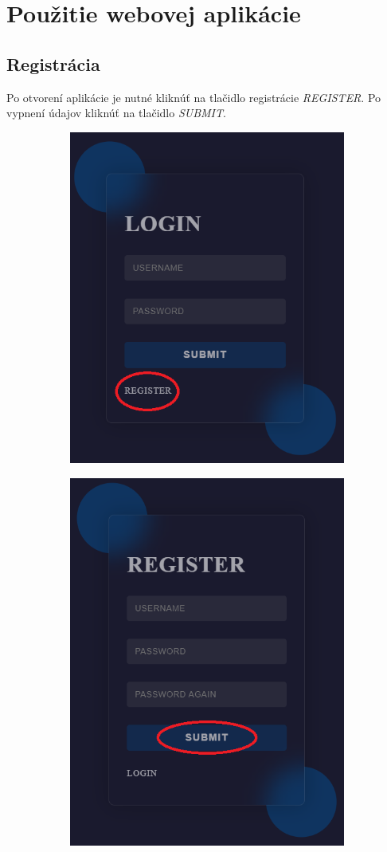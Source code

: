 \pagebreak
\section{Použitie webovej aplikácie}

\subsection{Registrácia}
Po otvorení aplikácie je nutné kliknúť na tlačidlo registrácie \textit{REGISTER}. Po vypnení údajov kliknúť na tlačidlo \textit{SUBMIT}.

\begin{figure}[H]
    \centering
    \begin{subfigure}{0.45\textwidth}
        \centering
        \includegraphics[width=.7\textwidth]{guide_includes/img/register_button.png}
    \end{subfigure}
    \begin{subfigure}{0.45\textwidth}
        \centering
        \includegraphics[width=.7\textwidth]{guide_includes/img/register_submit.png}

\end{subfigure}
\end{figure}
